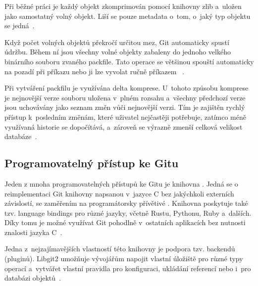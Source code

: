 Při běžné práci je každý objekt zkomprimován pomocí knihovny zlib a~uložen jako samostatný volný objekt. Liší se pouze metadata o~tom, o~jaký typ objektu se jedná~\cite{chacon2014progit}.

Když počet volných objektů překročí určitou mez, Git automaticky spustí údržbu. Během ní jsou všechny volné objekty zabaleny do jednoho velkého binárního souboru zvaného packfile. Tato operace se většinou spouští automaticky na pozadí při příkazu  nebo ji lze vyvolat ručně příkazem ~\cite{chacon2014progit}.

Při vytváření packfilu je využívána delta komprese. U~tohoto způsobu komprese je nejnovější verze souboru uložena v~plném rozsahu a~všechny předchozí verze jsou uchovávány jako seznam změn vůči nejnovější verzi. Tím je zajištěn rychlý přístup k~posledním změnám, které uživatel nejčastěji potřebuje, zatímco méně využívaná historie se dopočítává, a~zároveň se výrazně zmenší celková velikost databáze~\cite{chacon2014progit}.


\subsection{Programovatelný přístup ke Gitu}
\label{sec:git_api}
Jeden z mnoha programovatelných přístupů ke Gitu je knihovna . Jedná se o reimplementaci Git knihovny napsanou v~jazyce C bez jakýchkoli externích závislostí, se zaměřením na programátorsky přívětivé \API{}.
Knihovna poskytuje také tzv. language bindings pro různé jazyky, včetně Rustu, Pythonu, Ruby a~dalších. Díky tomu je možné využívat Git pohodlně v~ostatních aplikacích bez nutnosti znalosti jazyka C~\cite{chacon2014progit}.

Jedna z~nejzajímavějších vlastností této knihovny je podpora tzv. backendů (pluginů). Libgit2 umožňuje vývojářům napojit vlastní úložiště pro různé typy operací a~vytvářet vlastní pravidla pro konfiguraci, ukládání referencí nebo i~pro databázi objektů~\cite{chacon2014progit}.


\endinput